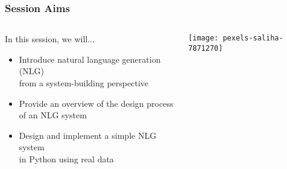\begin{frame}
\frametitle{Session Aims}
\begin{columns}

	\begin{column}{0.6\textwidth}
		In this session, we will...
		
		\vspace{12pt}
		
		\begin{itemize}
		\item Introduce natural language generation (NLG)\\
		      from a system-building perspective
		
		\item Provide an overview of the design process\\
		      of an NLG system
		
		\item Design and implement a simple NLG system\\
		      in Python using real data
		\end{itemize}
	\end{column}
	
	\begin{column}{0.4\textwidth}
		\centering
		\texttt{[image: pexels-saliha-7871270]}
	\end{column}

\end{columns}
\end{frame}
